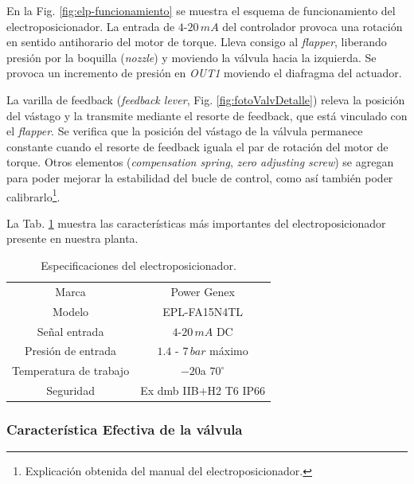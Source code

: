 En la Fig. \ref{fig:elp-funcionamiento} se muestra el esquema de
funcionamiento del electroposicionador.
La entrada de $4$-$20\,mA$ del controlador provoca una rotación en sentido
antihorario del motor de torque.
Lleva consigo al \emph{flapper}, liberando
presión por la boquilla (\emph{nozzle}) y moviendo la válvula hacia la
izquierda.
Se provoca un incremento de presión en \emph{OUT1} moviendo el diafragma del
actuador.

La varilla de feedback (\emph{feedback lever}, Fig. \ref{fig:fotoValvDetalle})
releva la posición del vástago y
la transmite mediante el resorte de feedback, que está vinculado con el
\emph{flapper}.
Se verifica que la posición del vástago de la válvula permanece constante
cuando el resorte de feedback iguala el par de rotación del motor de torque.
Otros elementos (\emph{compensation spring}, \emph{zero adjusting screw}) se
agregan para poder mejorar la estabilidad del bucle de control, como así
también poder calibrarlo\footnote{Explicación obtenida del manual del
electroposicionador.}.

La Tab. \ref{tab:especifElectroP} muestra las características más importantes
del electroposicionador presente en nuestra planta.

\begin{table}[ht]
\renewcommand{\arraystretch}{1.3}
 \centering
 \begin{tabular}{|c|c|}
  \hline
  Marca & Power Genex\\
  Modelo & EPL-FA15N4TL\\
  Señal entrada & $4$-$20\,mA$ DC\\
  Presión de entrada & $1.4$ - $7\,bar$ máximo\\
  Temperatura de trabajo & $-20$a $70^\circ$\\
  Seguridad & Ex dmb IIB+H2 T6 IP66\\
  \hline
 \end{tabular}
 \caption{Especificaciones del electroposicionador.}
 \label{tab:especifElectroP}
\end{table}

\subsubsection{Característica Efectiva de la válvula}

